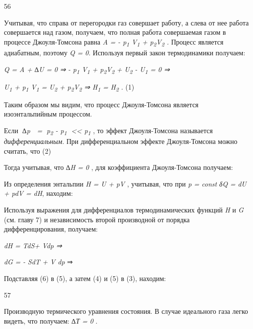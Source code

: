 56

Учитывая, что справа от перегородки газ совершает работу, а слева от нее
работа совершается над газом, получаем, что полная работа совершаемая
газом в процессе Джоуля-Томсона равна \emph{A = - p\textsubscript{1}
V\textsubscript{1} + p\textsubscript{2}V\textsubscript{2} .} Процесс
является адиабатным, поэтому \emph{Q = 0}. Используя первый закон
термодинамики получаем:

\emph{Q = A + ∆U = 0 ⇒} \emph{- p\textsubscript{1} V\textsubscript{1} +
p\textsubscript{2}V\textsubscript{2}} \emph{+ U\textsubscript{2} -
U\textsubscript{1} = 0 ⇒}

\emph{U\textsubscript{1} + p\textsubscript{1} V\textsubscript{1} =
U\textsubscript{2} + p\textsubscript{2}V\textsubscript{2} ⇒
H\textsubscript{1} = H\textsubscript{2} .} (1)

Таким образом мы видим, что процесс Джоуля-Томсона является
изоэнтальпийным процессом.

Если \emph{∆p  = p\textsubscript{2} - p\textsubscript{1}
\textless\textless{} p\textsubscript{1}} , то эффект Джоуля-Томсона
называется \emph{дифференциальным}. При дифференциальном эффекте
Джоуля-Томсона можно считать, что %
(2)

Тогда учитывая, что \emph{∆H = 0} , для коэффициента Джоуля-Томсона
получаем: %

Из определения энтальпии \emph{H = U + pV} , учитывая, что при \emph{p =
const} \emph{δQ = dU + pdV = dH}, находим:


Используя выражения для дифференциалов термодинамических функций
\emph{H} и \emph{G} (см. главу 7) и независимость второй производной от
порядка дифференцирования, получаем:

\emph{dH = TdS+ Vdp ⇒} %

\emph{dG = - SdT + V dp} ⇒ %

Подставляя (6) в (5), а затем (4) и (5) в (3), находим:


57

Производную %
термического уравнения состояния. В случае идеального газа легко видеть,
что %
получаем: \emph{∆Т = 0} .


